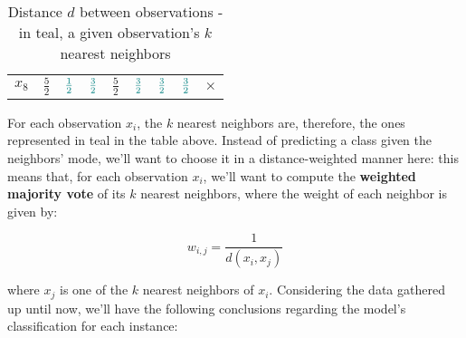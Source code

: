 \documentclass[12pt]{article}
\begin{document}
\begin{enumerate}[leftmargin=\labelsep]
\begin{table}[h]
\begin{tabular}{lllllllll}
    $x_8$ & $\frac{5}{2}$                   & $\textcolor{teal}{\frac{1}{2}}$ & $\textcolor{teal}{\frac{3}{2}}$ & $\frac{5}{2}$                   & $\textcolor{teal}{\frac{3}{2}}$ & $\textcolor{teal}{\frac{3}{2}}$ & $\textcolor{teal}{\frac{3}{2}}$ & $\times$                       
    \end{tabular}
    \caption{Distance $d$ between observations - in teal, a given observation's $k$ nearest neighbors}
  \end{table}

  For each observation $x_i$, the $k$ nearest neighbors are, therefore, the ones represented in
  teal in the table above. Instead of predicting a class given the neighbors' mode,
  we'll want to choose it in a distance-weighted manner here: this means that, for each
  observation $x_i$, we'll want to compute the \textbf{weighted majority vote} of its $k$ nearest
  neighbors, where the weight of each neighbor is given by:

  $$w_{i, j} = \frac{1}{d(x_i, x_j)}$$

  where $x_j$ is one of the $k$ nearest neighbors of $x_i$. Considering the data gathered up until now,
  we'll have the following conclusions regarding the model's classification for each instance:


\end{enumerate}
\end{document}
